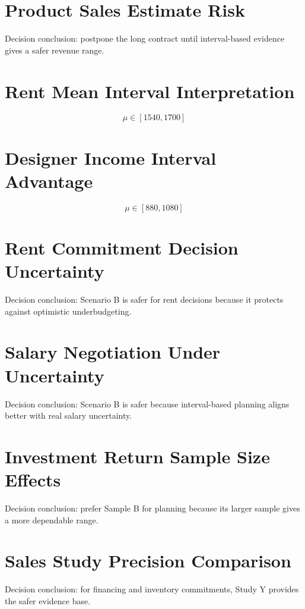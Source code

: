 \section{Product Sales Estimate Risk}
Decision conclusion: postpone the long contract until interval-based evidence gives a safer revenue range.

\section{Rent Mean Interval Interpretation}
\[\mu \in [1540,1700]\]

\section{Designer Income Interval Advantage}
\[\mu \in [880,1080]\]

\section{Rent Commitment Decision Uncertainty}
Decision conclusion: Scenario B is safer for rent decisions because it protects against optimistic underbudgeting.

\section{Salary Negotiation Under Uncertainty}
Decision conclusion: Scenario B is safer because interval-based planning aligns better with real salary uncertainty.

\section{Investment Return Sample Size Effects}
Decision conclusion: prefer Sample B for planning because its larger sample gives a more dependable range.

\section{Sales Study Precision Comparison}
Decision conclusion: for financing and inventory commitments, Study Y provides the safer evidence base.


